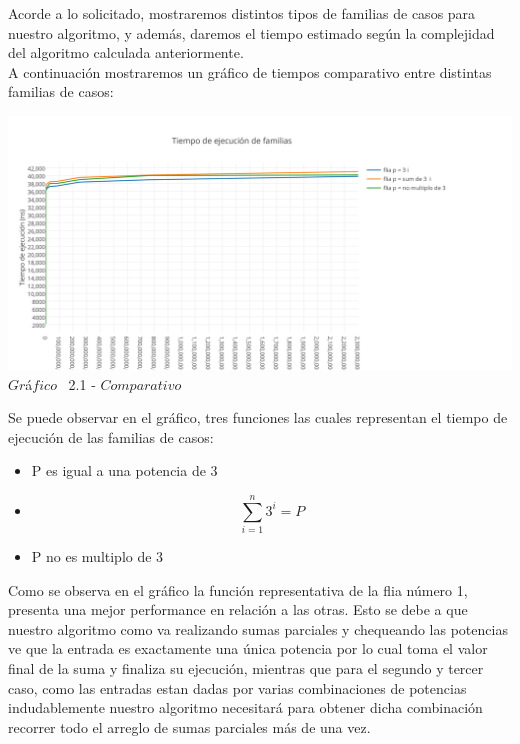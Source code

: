 \indent Acorde a lo solicitado, mostraremos distintos tipos de familias de casos para nuestro algoritmo, y adem\'as, daremos el tiempo estimado 
seg\'un la complejidad del algoritmo calculada anteriormente.\\

A continuaci\'on mostraremos un gr\'afico de tiempos comparativo entre distintas familias de casos:\\ 

\vspace*{0.3cm} \vspace*{0.3cm}
  \begin{center}
 \includegraphics[scale=0.65]{./EJ2/comparativo.png}
 {$Gr$\'a$fico$ \ 2.1 - $Comparativo$}
  \end{center}
  \vspace*{0.3cm}
  
Se puede observar en el gr\'afico, tres funciones las cuales representan el tiempo de ejecuci\'on de las familias de casos:\\
\begin{itemize}
\item P es igual a una potencia de 3
\item \[
\sum_{i=1}^{n}3^{i}=P 
\]
\item P no es multiplo de 3
\end{itemize}

Como se observa en el gr\'afico la funci\'on representativa de la flia n\'umero 1, presenta una mejor performance en relaci\'on a las otras. Esto se debe a que nuestro algoritmo como va realizando sumas parciales y chequeando las potencias ve que la entrada es exactamente una \'unica potencia por lo cual toma el valor final de la suma y finaliza su ejecuci\'on, mientras que para el segundo y tercer caso, como las entradas estan dadas por varias combinaciones de potencias indudablemente nuestro algoritmo necesitar\'a para obtener dicha combinaci\'on recorrer todo el arreglo de sumas parciales m\'as de una vez.

